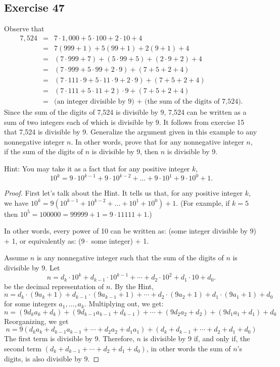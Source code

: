 \documentclass[14pt]{extarticle}
\begin{document}
\subsection{Exercise 47}
Observe that
\[
\begin{array}{rcl}
7,524 &=& 7 \cdot 1,000 + 5 \cdot 100 + 2 \cdot 10 + 4\\
&=& 7(999 + 1) + 5(99 + 1) + 2(9 + 1) + 4\\
&=& (7 \cdot 999 + 7) + (5 \cdot 99 + 5) + (2 \cdot 9 + 2) + 4\\
&=& (7 \cdot 999 + 5 \cdot 99 + 2 \cdot 9) + (7 + 5 + 2 + 4)\\
&=& (7 \cdot 111 \cdot 9 + 5 \cdot 11 \cdot 9 + 2 \cdot 9) + (7 + 5 + 2 + 4)\\
&=& (7 \cdot 111 + 5 \cdot 11 + 2) \cdot 9 + (7 + 5 + 2 + 4)\\
&=& \text{(an integer divisible by 9) + (the sum of the digits of 7,524)}.
\end{array}
\]
Since the sum of the digits of 7,524 is divisible by 9, 7,524 can be written as a sum of two integers each of which is divisible by 9. It follows from exercise 15 that 7,524 is divisible by 9. Generalize the argument given in this example to any nonnegative integer $n$. In other words, prove that for any nonnegative integer $n$, if the sum of the digits of $n$ is divisible by 9, then $n$ is divisible by 9.

Hint: You may take it as a fact that for any positive
integer $k$, 
\[
10^k = 9\cdot10^{k-1} + 9\cdot10^{k-2} + \ldots + 9\cdot10^1 + 9\cdot10^0 + 1.
\]
\begin{proof}
First let's talk about the Hint. It tells us that, for any positive integer $k$, we have $10^k = 9(10^{k-1} +10^{k-2} + \ldots + 10^1 + 10^0) + 1$. (For example, if $k = 5$ then $10^5 = 100000 = 99999 + 1 = 9 \cdot 11111 + 1$.)

In other words, every power of 10 can be written as: (some integer divisible by 9) + 1, or equivalently as: ($9 \cdot$ some integer) + 1.

Assume $n$ is any nonnegative integer such that the sum of the digits of $n$ is divisible by 9. Let
\[
n = d_k \cdot 10^k + d_{k-1} \cdot 10^{k-1} + \cdots + d_2 \cdot 10^2 + d_1 \cdot 10 + d_0. 
\]
be the decimal representation of $n$. By the Hint, 
\[
n = d_k \cdot (9a_k + 1) + d_{k-1} \cdot (9a_{k-1}+1) + \cdots + d_2 \cdot (9a_2+1) + d_1 \cdot (9a_1+1) + d_0
\]
for some integers $a_1, \ldots, a_k$. Multiplying out, we get:
\[
n = (9d_ka_k + d_k) + (9d_{k-1}a_{k-1} + d_{k-1}) + \cdots + (9d_2 a_2 + d_2) + (9d_1a_1 + d_1) + d_0
\]
Reorganizing, we get
\[
n = 9(d_ka_k + d_{k-1}a_{k-1} + \cdots + d_2 a_2 + d_1a_1) + (d_k + d_{k-1} + \cdots + d_2 + d_1 + d_0)
\]
The first term is divisible by 9. Therefore, $n$ is divisible by 9 if, and only if, the second term $(d_k + d_{k-1} + \cdots + d_2 + d_1 + d_0)$, in other words the sum of $n$'s digits, is also divisible by 9.
\end{proof}
\end{document}
